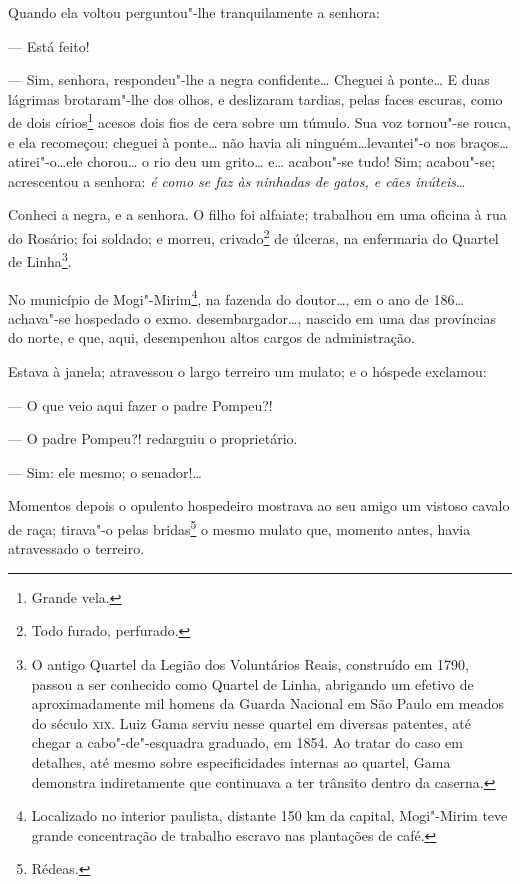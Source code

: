   Quando ela voltou perguntou"-lhe tranquilamente a senhora:

  --- Está feito!

--- Sim, senhora, respondeu"-lhe a negra confidente\ldots{} Cheguei à
ponte\ldots{} E duas lágrimas brotaram"-lhe dos olhos, e deslizaram tardias,
pelas faces escuras, como de dois círios\footnote{Grande vela.} acesos
dois fios de cera sobre um túmulo. Sua voz tornou"-se rouca, e ela
recomeçou: cheguei à ponte\ldots{} não havia ali ninguém\ldots{}levantei"-o nos
braços\ldots{}atirei"-o\ldots{}ele chorou\ldots{} o rio deu um grito\ldots{} e\ldots{} acabou"-se
tudo! Sim; acabou"-se; acrescentou a senhora: \emph{é como se faz às
ninhadas de gatos, e cães inúteis}\ldots{}

Conheci a negra, e a senhora. O filho foi alfaiate; trabalhou em uma
oficina à rua do Rosário; foi soldado; e morreu, crivado\footnote{Todo
  furado, perfurado.} de úlceras, na enfermaria do Quartel de
Linha\footnote{O antigo Quartel da Legião dos Voluntários Reais,
  construído em 1790, passou a ser conhecido como Quartel de Linha,
  abrigando um efetivo de aproximadamente mil homens da Guarda Nacional
  em São Paulo em meados do século \textsc{xix}. Luiz Gama serviu nesse quartel
  em diversas patentes, até chegar a cabo"-de"-esquadra graduado, em 1854.
  Ao tratar do caso em detalhes, até mesmo sobre especificidades
  internas ao quartel, Gama demonstra indiretamente que continuava a ter
  trânsito dentro da caserna.}.

\asterisc

No município de Mogi"-Mirim\footnote{Localizado no interior paulista,
  distante 150 km da capital, Mogi"-Mirim teve grande concentração de
  trabalho escravo nas plantações de café.}, na fazenda do doutor\ldots{}, em
o ano de 186\ldots{} achava"-se hospedado o exmo. desembargador\ldots{}, nascido em
uma das províncias do norte, e que, aqui, desempenhou altos cargos de
administração.

Estava à janela; atravessou o largo terreiro um mulato; e o hóspede
exclamou:

--- O que veio aqui fazer o padre Pompeu?!

--- O padre Pompeu?! redarguiu o proprietário.

--- Sim: ele mesmo; o senador!\ldots{}

Momentos depois o opulento hospedeiro mostrava ao seu amigo um vistoso
  cavalo de raça; tirava"-o pelas bridas\footnote{Rédeas.} o mesmo
  mulato que, momento antes, havia atravessado o terreiro.

